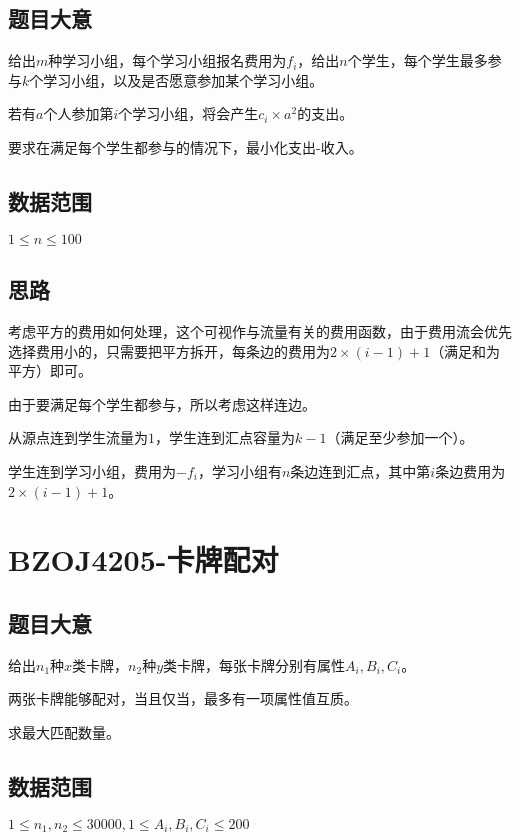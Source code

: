 \documentclass{ctexart}
\numberwithin{equation}{section}
\begin{document}
\begin{flushleft}
  \subsection{题目大意}
  给出$m$种学习小组，每个学习小组报名费用为$f_i$，给出$n$个学生，每个学生最多参与$k$个学习小组，以及是否愿意参加某个学习小组。

  若有$a$个人参加第$i$个学习小组，将会产生$c_i\times a^2$的支出。

  要求在满足每个学生都参与的情况下，最小化\;支出-收入。
  
    
  \subsection{数据范围}
  $1\le n \le 100$
  \subsection{思路}
  考虑平方的费用如何处理，这个可视作与流量有关的费用函数，由于费用流会优先选择费用小的，只需要把平方拆开，每条边的费用为$2\times (i-1)+1$（满足和为平方）即可。

  由于要满足每个学生都参与，所以考虑这样连边。

  从源点连到学生流量为$1$，学生连到汇点容量为$k-1$（满足至少参加一个）。

  学生连到学习小组，费用为$-f_i$，学习小组有$n$条边连到汇点，其中第$i$条边费用为$2\times (i-1)+1$。

  \newpage

  \section{BZOJ4205-卡牌配对}
  \subsection{题目大意}
  给出$n_1$种$x$类卡牌，$n_2$种$y$类卡牌，每张卡牌分别有属性$A_i,B_i,C_i$。

  两张卡牌能够配对，当且仅当，最多有一项属性值互质。

  求最大匹配数量。
  
    
  \subsection{数据范围}
  $1\le n_1,n_2 \le 30000,1\le A_i,B_i,C_i\le 200$

\end{flushleft}
\end{document}
